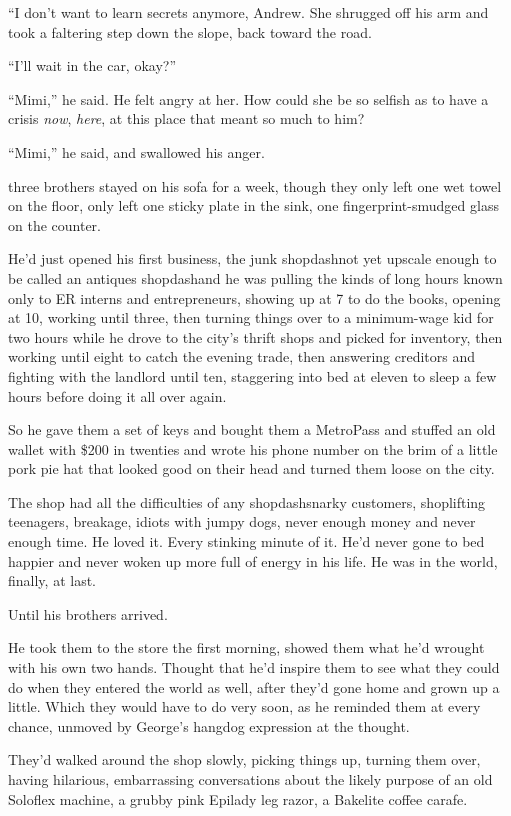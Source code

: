 ``I don't want to learn secrets anymore, Andrew.  She shrugged off his
arm and took a faltering step down the slope, back toward the road.

``I'll wait in the car, okay?''

``Mimi,'' he said.  He felt angry at her.  How could she be so selfish
as to have a crisis \textit{now}, \textit{here}, at this place that
meant so much to him?

``Mimi,'' he said, and swallowed his anger.

 three brothers stayed on his sofa for a week, though they only
left one wet towel on the floor, only left one sticky plate in the
sink, one fingerprint-smudged glass on the counter.

He'd just opened his first business, the junk shopdash{}not yet upscale
enough to be called an antiques shopdash{}and he was pulling the kinds of
long hours known only to ER interns and entrepreneurs, showing up at 7
to do the books, opening at 10, working until three, then turning
things over to a minimum-wage kid for two hours while he drove to the
city's thrift shops and picked for inventory, then working until eight
to catch the evening trade, then answering creditors and fighting with
the landlord until ten, staggering into bed at eleven to sleep a few
hours before doing it all over again.

So he gave them a set of keys and bought them a MetroPass and stuffed
an old wallet with \$200 in twenties and wrote his phone number on the
brim of a little pork pie hat that looked good on their head and
turned them loose on the city.

The shop had all the difficulties of any shopdash{}snarky customers,
shoplifting teenagers, breakage, idiots with jumpy dogs, never enough
money and never enough time.  He loved it.  Every stinking minute of
it.  He'd never gone to bed happier and never woken up more full of
energy in his life.  He was in the world, finally, at last.

Until his brothers arrived.

He took them to the store the first morning, showed them what he'd
wrought with his own two hands.  Thought that he'd inspire them to see
what they could do when they entered the world as well, after they'd
gone home and grown up a little.  Which they would have to do very
soon, as he reminded them at every chance, unmoved by George's hangdog
expression at the thought.

They'd walked around the shop slowly, picking things up, turning them
over, having hilarious, embarrassing conversations about the likely
purpose of an old Soloflex machine, a grubby pink Epilady leg razor, a
Bakelite coffee carafe.

